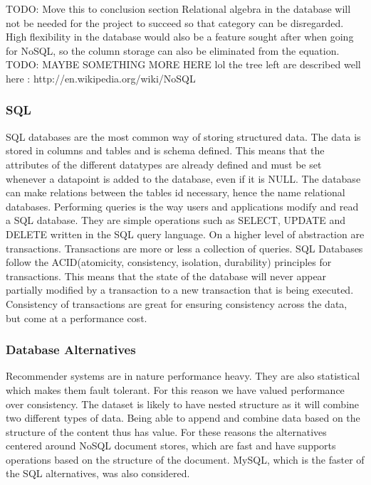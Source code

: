 TODO: Move this to conclusion section
Relational algebra in the database will not be needed for the project to succeed so that category can be disregarded. High flexibility in the database would also be a feature sought after when going for NoSQL, so the column storage can also be eliminated from the equation. TODO: MAYBE SOMETHING MORE HERE lol the tree left are described well here : http://en.wikipedia.org/wiki/NoSQL
\cite{nosql-databases, nosql-article}


\subsubsection*{SQL}
SQL databases are the most common way of storing structured data. The data is stored in columns and tables and is schema defined. This means that the attributes of the different datatypes are already defined and must be set whenever a datapoint is added to the database, even if it is NULL. The database can make relations between the tables id necessary, hence the name relational databases.
Performing queries is the way users and applications modify and read a SQL database. They are simple operations such as SELECT, UPDATE and DELETE written in the SQL query language. On a higher level of abstraction are transactions. Transactions are more or less a collection of queries. SQL Databases follow the ACID(atomicity, consistency, isolation, durability) principles for transactions. This means that the state of the database will never appear partially modified by a transaction to a new transaction that is being executed. Consistency of transactions are great for ensuring consistency across the data, but come at a performance cost.
\cite{ramakrishnan2003database}

\subsubsection{Database Alternatives}
Recommender systems are in nature performance heavy. They are also statistical which makes them fault tolerant. For this reason we have valued performance over consistency. The dataset is likely to have nested structure as it will combine two different types of data. Being able to append and combine data based on the structure of the content thus has value.
For these reasons the alternatives centered around NoSQL document stores, which are fast and have supports operations based on the structure of the document.
MySQL, which is the faster of the SQL alternatives, was also considered.

